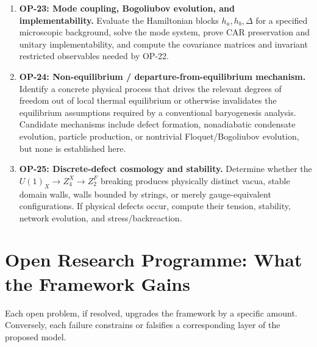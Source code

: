 \documentclass[11pt]{article}
\theoremstyle{canonmath}
\theoremstyle{canonpostulate}
\theoremstyle{canonclaim}
\def\mathbb#1{#1}%
\begin{document}
\begin{enumerate}
\begin{enumerate}[label=\textbf{OP-22\alph*.}, leftmargin=*, itemsep=0.1em]
\end{enumerate}
\item \textbf{OP-23: Mode coupling, Bogoliubov evolution, and implementability.} Evaluate the Hamiltonian blocks $h_a,h_b,\Delta$ for a specified microscopic background, solve the mode system, prove CAR preservation and unitary implementability, and compute the covariance matrices and invariant restricted observables needed by OP-22.
\item \textbf{OP-24: Non-equilibrium / departure-from-equilibrium mechanism.} Identify a concrete physical process that drives the relevant degrees of freedom out of local thermal equilibrium or otherwise invalidates the equilibrium assumptions required by a conventional baryogenesis analysis. Candidate mechanisms include defect formation, nonadiabatic condensate evolution, particle production, or nontrivial Floquet/Bogoliubov evolution, but none is established here.
\item \textbf{OP-25: Discrete-defect cosmology and stability.} Determine whether the $U(1)_X\to\mathbb Z_4^X\to\mathbb Z_2^F$ breaking produces physically distinct vacua, stable domain walls, walls bounded by strings, or merely gauge-equivalent configurations. If physical defects occur, compute their tension, stability, network evolution, and stress/backreaction.
\end{enumerate}

\section{Open Research Programme: What the Framework Gains}
\label{sec:programme}

Each open problem, if resolved, upgrades the framework by a specific amount. Conversely, each failure constrains or falsifies a corresponding layer of the proposed model.
\end{document}
